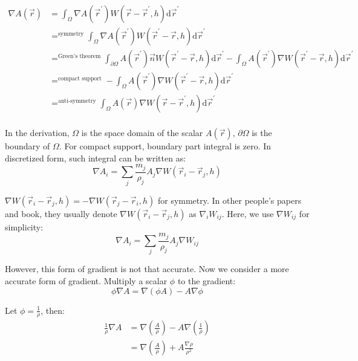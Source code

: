 \begin{equation}
    \begin{aligned}
        \nabla A(\vec{r}) &= 
        \int_{\Omega} \nabla A(\vec{r}^\prime) W(\vec{r} - \vec{r}^\prime,h)\mathrm{d}\vec{r}^\prime \\
        &\mathop{=}^{\text{symmetry}}
        \int_{\Omega} \nabla A(\vec{r}^\prime) W(\vec{r}^\prime-\vec{r},h)\mathrm{d}\vec{r}^\prime\\
        &\mathop{=}^{\text{Green's theorem}}
        \int_{\partial\Omega} A(\vec{r}^\prime) \vec{n} W(\vec{r}^\prime-\vec{r},h)\mathrm{d}\vec{r}^\prime
        - \int_{\Omega} A(\vec{r}^\prime) \nabla W(\vec{r}^\prime-\vec{r},h)\mathrm{d}\vec{r}^\prime\\
        &\mathop{=}^{\text{compact support}}
        - \int_{\Omega} A(\vec{r}^\prime) \nabla W(\vec{r}^\prime-\vec{r},h)\mathrm{d}\vec{r}^\prime\\
        &\mathop{=}^{\text{anti-symmetry}}
        \int_{\Omega} A(\vec{r}) \nabla W(\vec{r}-\vec{r}^\prime,h)\mathrm{d}\vec{r}^\prime\\
    \end{aligned}
\end{equation}

In the derivation, 
$\Omega$ is the space domain of the scalar $A(\vec{r})$, 
$\partial\Omega$ is the boundary of $\Omega$. 
For compact support, 
boundary part integral is zero.
In discretized form, 
such integral can be written as:
\begin{equation}
    \nabla A_i = \sum_j \frac{m_j}{\rho_j} A_j \nabla W(\vec{r}_i - \vec{r}_j, h)
\end{equation}

$\nabla W(\vec{r}_i - \vec{r}_j, h) = -\nabla W(\vec{r}_j - \vec{r}_i, h)$ for symmetry. 
In other people's papers and book, they usually denote $\nabla W(\vec{r}_i - \vec{r}_j, h)$ as $\nabla_i W_{ij}$. 
Here, we use $\nabla W_{ij}$ for simplicity:
\begin{equation}
    \nabla A_i = \sum_j \frac{m_j}{\rho_j} A_j \nabla W_{ij}
\end{equation}

However, this form of gradient is not that accurate. 
Now we consider a more accurate form of gradient. 
Multiply a scalar $\phi$ to the gradient:
\begin{equation}
    \phi\nabla A = \nabla(\phi A) - A\nabla\phi
\end{equation}

Let $\phi = \frac{1}{\rho}$, 
then:
\begin{equation}
    \begin{aligned}
        \frac{1}{\rho}\nabla A &= \nabla\left(\frac{A}{\rho}\right) - A\nabla\left(\frac{1}{\rho}\right)\\
        &=
        \nabla\left(\frac{A}{\rho}\right) + A\frac{\nabla\rho}{\rho^2}
    \end{aligned}
\end{equation}

